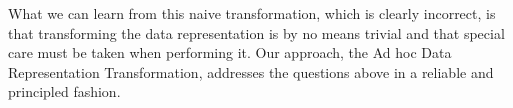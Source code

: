 What we can learn from this naive transformation, which is clearly incorrect, is that transforming the data representation is by no means trivial and that special care must be taken when performing it. Our approach, the Ad hoc Data Representation Transformation, addresses the questions above in a reliable and principled fashion.

